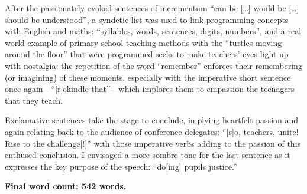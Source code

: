 \documentclass[11pt,a4paper]{article}
\begin{document}
After the passionately evoked sentences of incrementum ``can be [\ldots] would be [\ldots] should be understood'', a syndetic list was used to link programming concepts with English and maths: ``syllables, words, sentences, digits, numbers'', and a real world example of primary school teaching methods with the ``turtles moving around the floor'' that were programmed seeks to make teachers' eyes light up with nostalgia: the repetition of the word ``remember'' enforces their remembering (or imagining) of these moments, especially with the imperative short sentence once again---``[r]ekindle that''---which implores them to empassion the teenagers that they teach. 

Exclamative sentences take the stage to conclude, implying heartfelt passion and again relating back to the audience of conference delegates: ``[s]o, teachers, unite! Rise to the challenge[!]'' with those imperative verbs adding to the passion of this enthused conclusion. I envisaged a more sombre tone for the last sentence as it expresses the key purpose of the speech: ``do[ing] pupils justice.''

\begin{center}
	\textbf{Final word count: 542 words.}
\end{center}
\end{document}

